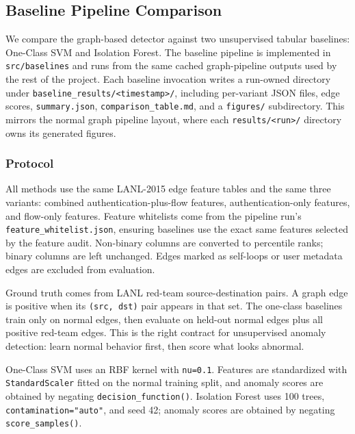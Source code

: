 %

\subsection{Baseline Pipeline Comparison}
\label{sec:baseline_pipeline}

We compare the graph-based detector against two unsupervised tabular baselines: One-Class SVM and Isolation Forest. The baseline pipeline is implemented in \texttt{src/baselines} and runs from the same cached graph-pipeline outputs used by the rest of the project. Each baseline invocation writes a run-owned directory under \texttt{baseline\_results/<timestamp>/}, including per-variant JSON files, edge scores, \texttt{summary.json}, \texttt{comparison\_table.md}, and a \texttt{figures/} subdirectory. This mirrors the normal graph pipeline layout, where each \texttt{results/<run>/} directory owns its generated figures.

\subsubsection{Protocol}

All methods use the same LANL-2015 edge feature tables and the same three variants: combined authentication-plus-flow features, authentication-only features, and flow-only features. Feature whitelists come from the pipeline run's \texttt{feature\_whitelist.json}, ensuring baselines use the exact same features selected by the feature audit. Non-binary columns are converted to percentile ranks; binary columns are left unchanged. Edges marked as self-loops or user metadata edges are excluded from evaluation.

Ground truth comes from LANL red-team source-destination pairs. A graph edge is positive when its \texttt{(src, dst)} pair appears in that set. The one-class baselines train only on normal edges, then evaluate on held-out normal edges plus all positive red-team edges. This is the right contract for unsupervised anomaly detection: learn normal behavior first, then score what looks abnormal.

One-Class SVM uses an RBF kernel with \texttt{nu=0.1}. Features are standardized with \texttt{StandardScaler} fitted on the normal training split, and anomaly scores are obtained by negating \texttt{decision\_function()}. Isolation Forest uses 100 trees, \texttt{contamination="auto"}, and seed 42; anomaly scores are obtained by negating \texttt{score\_samples()}.

